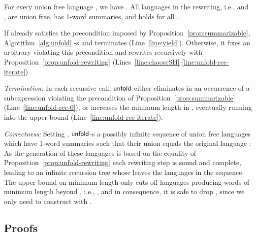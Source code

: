 \documentclass[envcountsame]{llncs}
\newcommand{\unfold}{\ensuremath{{\sf unfold}}\xspace}
\begin{document}
\begin{proposition}
  \label{prop:unfold-rewriting}
  For every union free language , we have . All languages in the rewriting, i.e.,  and
  , are union free,  has 1-word
  summaries, and  holds for all .
\end{proposition}


If  already satisfies the precondition imposed by
Proposition~\ref{prop:summarizable}, Algorithm~\ref{alg:unfold}
\Yield-s  and terminates (Line~\ref{line:yield}).
Otherwise, it fixes an arbitrary  violating this precondition and
rewrites  recursively with Proposition~\ref{prop:unfold-rewriting}
(Lines~\ref{line:chooseSH}-\ref{line:unfold-rec-iterate}).
\begin{inparaenum}[\bfseries(1)]
\item \emph{Termination:} In each recursive call, \unfold either
  eliminates in  an occurrence of a subexpression  violating
  the precondition of Proposition~\ref{prop:summarizable}
  (Line~\ref{line:unfold-rec-0}), or increases the minimum length in
  , eventually running into the upper bound 
  (Line~\ref{line:unfold-rec-iterate}).
\item \emph{Correctness:} Setting , \unfold \Yield-s a
  possibly infinite sequence of union free languages which have 1-word
  summaries such that their union equals the original language :
As the generation of these languages is based on the equality of
  Proposition~\ref{prop:unfold-rewriting} each rewriting step is sound
  and complete, leading to an infinite recursion tree whose leaves
  \Yield the languages in the sequence.
The upper bound on minimum length only cuts off languages 
  producing words of minimum length beyond , i.e., , and in consequence, it is safe to drop
  , since we only need to construct
   with
  .
\end{inparaenum}

 \subsection{Proofs}
\label{sec:decision-proofs}
\end{document}

